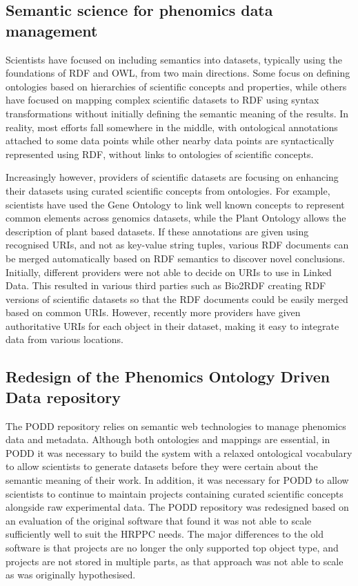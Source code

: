 \documentclass{llncs}
\begin{document}
\subsection{Semantic science for phenomics data management}
Scientists have focused on including semantics into datasets, typically using
the foundations of RDF and OWL, from two main directions. Some focus on defining
ontologies based on hierarchies of scientific concepts and properties, while
others have focused on mapping complex scientific datasets to RDF using syntax
transformations without initially defining the semantic meaning of the results.
In reality, most efforts fall somewhere in the middle, with ontological
annotations attached to some data points while other nearby data points are
syntactically represented using RDF, without links to ontologies of scientific
concepts.


Increasingly however, providers of scientific datasets are focusing on enhancing
their datasets using curated scientific concepts from ontologies. For example,
scientists have used the Gene Ontology \cite{Ashburner2000} to link well known concepts to
represent common elements across genomics datasets, while the Plant Ontology \cite{Avraham2008} 
allows the description of plant based datasets. If these annotations are
given using recognised URIs, and not as key-value string tuples, various RDF
documents can be merged automatically based on RDF semantics to discover novel
conclusions. Initially, different providers were not able to decide on URIs to
use in Linked Data. This resulted in various third parties such as Bio2RDF
\cite{Belleau2008}
creating RDF versions of scientific datasets so that the RDF documents could be
easily merged based on common URIs. However, recently more providers have given
authoritative URIs for each object in their dataset, making it easy to integrate
data from various locations.


\subsection{Redesign of the Phenomics Ontology Driven Data repository}
The PODD repository relies on semantic web technologies to
manage phenomics data and metadata. Although both ontologies and mappings are
essential, in PODD it was necessary to build the system with a relaxed
ontological vocabulary to allow scientists to generate datasets before they were
certain about the semantic meaning of their work. In addition, it was necessary
for PODD to allow scientists to continue to maintain projects containing curated
scientific concepts alongside raw experimental data. The PODD repository was 
redesigned based on an evaluation of the original software \cite{Li2010} that 
found it was not able to scale sufficiently well to suit the HRPPC needs. The 
major differences to the old software is that projects are no longer the only 
supported top object type, and projects are not stored in multiple parts, as 
that approach was not able to scale as was originally hypothesised.
\end{document}

